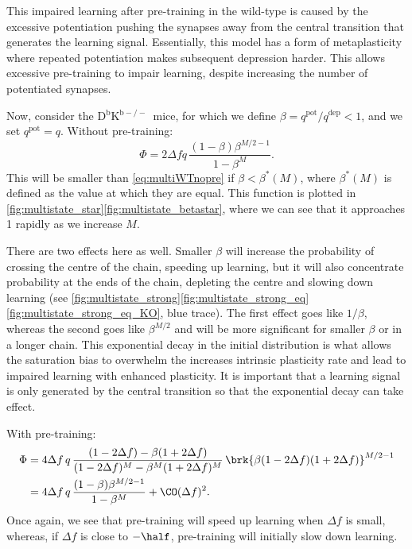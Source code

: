 \documentclass[12pt]{article}
\newcommand{\pot}{^{\text{pot}}}
\newcommand{\dep}{^{\text{dep}}}
\newcommand{\KO}{D$^\mathrm{b}$K$^{\mathrm{b}-/-}$}
\begin{document}
This impaired learning after pre-training in the wild-type is caused by the excessive potentiation pushing the synapses away from the central transition that generates the learning signal.
Essentially, this model has a form of metaplasticity where repeated potentiation makes subsequent depression harder.
This allows excessive pre-training to impair learning, despite increasing the number of potentiated synapses.


Now, consider the \KO\ mice, for which we define $\beta=q\pot/q\dep<1$, and we set $q\pot=q$.
Without pre-training:
%
\begin{equation}\label{eq:multiKOnopre}
  \Phi = 2{\Delta f} q\,\frac{(1-\beta)\beta^{M/2-1}}{1-\beta^M}.
\end{equation}
%
This will be smaller than \eqref{eq:multiWTnopre} if $\beta<\beta^*(M)$, where $\beta^*(M)$ is defined as the value at which they are equal.
This function is plotted in \autoref{fig:multistate_star}\ref{fig:multistate_betastar}, where we can see that it approaches 1 rapidly as we increase $M$.

There are two effects here as well.
Smaller $\beta$ will increase the probability of crossing the centre of the chain, speeding up learning, but it will also concentrate probability at the ends of the chain, depleting the centre and slowing down learning (see \autoref{fig:multistate_strong}\ref{fig:multistate_strong_eq}\ref{fig:multistate_strong_eq_KO}, blue trace).
The first effect goes like $1/\beta$, whereas the second goes like $\beta^{M/2}$ and will be more significant for smaller $\beta$ or in a longer chain.
This exponential decay in the initial distribution is what allows the saturation bias to overwhelm the increases intrinsic plasticity rate and lead to impaired learning with enhanced plasticity.
It is important that a learning signal is only generated by the central transition so that the exponential decay can take effect.

With pre-training:
%
\begin{equation}\label{eq:multiKOpre}
\begin{aligned}
  \Phi &= 4{\Delta f}\, q \, \frac{(1-2\Delta f) - \beta(1+2\Delta f)}
          {(1-2\Delta f)^M - \beta^M(1+2\Delta f)^M}   \,
          \brk{\beta (1-2\Delta f) (1+2\Delta f)}^{M/2-1} \\
       &= 4{\Delta f}\, q\,\frac{(1-\beta)\beta^{M/2-1}}{1-\beta^M} + \CO(\Delta f)^2.
\end{aligned}
\end{equation}
%
Once again, we see that pre-training will speed up learning when $\Delta f$ is small, whereas, if $\Delta f$ is close to $-\half$, pre-training will initially slow down learning.
\end{document}
